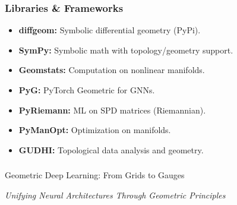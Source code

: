 \begin{frame}[fragile]\frametitle{Libraries \& Frameworks}
  \begin{itemize}
    \item \textbf{diffgeom:} Symbolic differential geometry (PyPi).
    \item \textbf{SymPy:} Symbolic math with topology/geometry support.
    \item \textbf{Geomstats:} Computation on nonlinear manifolds.
    \item \textbf{PyG:} PyTorch Geometric for GNNs.
    \item \textbf{PyRiemann:} ML on SPD matrices (Riemannian).
    \item \textbf{PyManOpt:} Optimization on manifolds.
    \item \textbf{GUDHI:} Topological data analysis and geometry.
  \end{itemize}
\end{frame}





















\begin{frame}[fragile]\frametitle{}
\begin{center}
{\Large Geometric Deep Learning: From Grids to Gauges}
\vspace{0.5cm}

{\em Unifying Neural Architectures Through Geometric Principles}
\end{center}
\end{frame}

